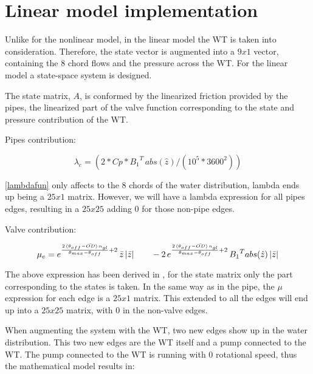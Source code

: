 
\section{Linear model implementation}
\label{MatlabScriptLinear}

Unlike for the nonlinear model, in the linear model the WT is taken into consideration. Therefore, the state vector is augmented into a $9x1$ vector, 
containing the 8 chord flows and the pressure across the WT. For the linear model a state-space system is designed.

The state matrix, $A$, is conformed by the linearized friction provided by the pipes, the linearized part of the valve function corresponding to the state and pressure contribution
of the WT.

Pipes contribution:

\begin{equation}
  {\lambda}_e = (2 * Cp * {B_1}^{T} \, abs(\hat{z}) /(10^5*3600^2))
  \label{lambdafun}
\end{equation}

\eqref{lambdafun} only affects to the 8 chords of the water distribution, lambda ends up being a $25x1$ matrix. However, we will have a lambda expression for all pipes
edges, resulting in a $25x25$ adding $0$ for those non-pipe edges. 

Valve contribution:

\vspace{4mm}
\begin{equation}
  {\mu}_e = e^{\frac{2 \, (\theta_{off} - \bar{OD}) \, n_{gl}}{\theta_{max}-\theta_{off}}+2} \, \bar{z} \, |\bar{z}| \quad \quad - \\
  2 \, e^{\frac{2 \, (\theta_{off} - \bar{OD}) \, n_{gl}}{\theta_{max}-\theta_{off}}+2} \, {B_1}^{T} abs(\hat{z}) \, |\bar{z}|
  \label{mufun}
\end{equation}

The above expression has been derived in , for the state matrix only the part corresponding to the states is taken. In the same way 
as in the pipe, the $\mu$ expression for each edge is a $25x1$ matrix. This extended to all the edges will end up into a $25x25$ matrix, with $0$ in the 
non-valve edges. 

When augmenting the system with the WT, two new edges show up in the water distribution. This two new edges are the WT itself and a pump connected to the WT.
The pump connected to the WT is running with $0$ rotational speed, thus the mathematical model results in:

